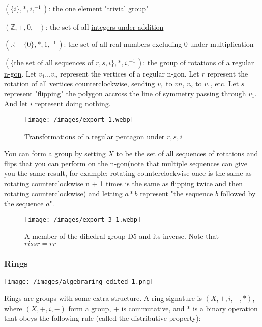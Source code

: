\documentclass{article} %
\begin{document}
\begin{itemize}
\item{$ (\{i\}, \ast, i, ^{-1})$: the one element "trivial group"}
\item{$ (\mathbb{Z}, +, 0, -)$: the set of all \href{https://en.wikipedia.org/wiki/Integer}{integers under addition}
\item{$ (\mathbb{R} - \{0\}, \ast, 1, ^{-1})$: the set of all real numbers excluding 0 under multiplication}
\item{$ (\{\text{the set of all sequences of  } r, s, i\}, \ast, i, ^{-1})$: the \href{https://en.wikipedia.org/wiki/Dihedral_group}{group of rotations of a regular n-gon}. Let $ v_1 \ldots v_n$ represent the vertices of a regular n-gon. Let $ r$ represent the rotation of all vertices counterclockwise, sending $ v_1$ to $ vn$, $ v_2$ to $ v_1$, etc. Let $ s$ represent "flipping" the polygon accross the line of symmetry passing through $ v_1$. And let $ i$ represent doing nothing.}

\begin{figure}
\texttt{[image: /images/export-1.webp]}
\caption{Transformations of a regular pentagon under $ r, s, i$}
\end{figure}

You can form a group by setting $ X$ to be the set of all sequences of rotations and flips that you can perform on the n-gon(note that multiple sequences can give you the same result, for example: rotating counterclockwise once is the same as rotating counterclockwise n + 1 times is the same as flipping twice and then rotating counterclockwise) and letting $ a \ast b$ represent "the sequence $ b$ followed by the sequence $ a$".

\begin{figure}
\texttt{[image: /images/export-3-1.webp]}
\caption{A member of the dihedral group D5 and its inverse. Note that $ rissr = rr$}
\end{figure}

\subsubsection{Rings}

\texttt{[image: /images/algebraring-edited-1.png]}

Rings are groups with some extra structure. A ring signature is $ (X, +, i, -, \ast)$, where $ (X, +, i, -)$ form a group, $ +$ is commutative, and $ \ast$ is a binary operation that obeys the following rule (called the distributive property):

}
\end{itemize}
\end{document}
